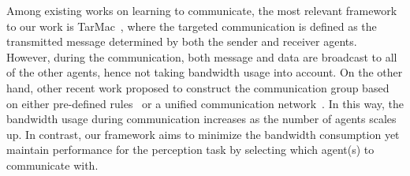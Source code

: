 Among existing works on learning to communicate, the most relevant framework to our work is TarMac~\cite{das2019tarmac}, where the targeted communication is defined as the transmitted message determined by both the sender and receiver agents. 
However, during the communication, both message and data are broadcast to all of the other agents, hence not taking bandwidth usage into account. 
On the other hand, other recent work proposed to construct the communication group based on 
either pre-defined rules~\cite{jiang2018learning,jiang2018graph} or a unified communication network~\cite{singh2018learning,sukhbaatar2016learning,hoshen2017vain,peng2017multiagent,singh2018learning,das2019tarmac}. 
In this way, the bandwidth usage during communication increases as the number of agents scales up. In contrast, our framework aims to minimize the bandwidth consumption yet maintain performance for the perception task by selecting which agent(s) to communicate with.















